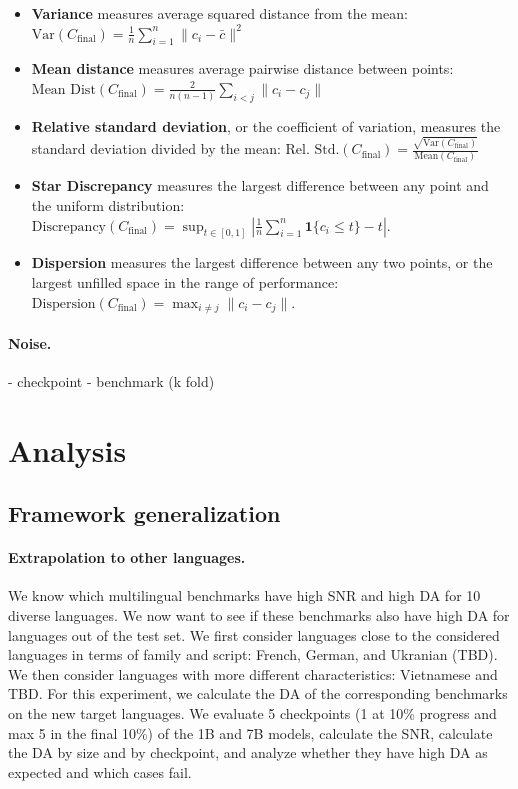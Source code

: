 \documentclass{article}
\begin{document}
\begin{itemize}
    \item \textbf{Variance} measures average squared distance from the mean: $\text{Var}(C_\text{final}) = \frac{1}{n} \sum_{i=1}^{n} \|c_i - \bar{c}\|^2$
    \item \textbf{Mean distance} measures average pairwise distance between points: $\text{Mean Dist}(C_\text{final}) = \frac{2}{n(n-1)} \sum_{i < j} \|c_i - c_j\|$
    \item \textbf{Relative standard deviation}, or the coefficient of variation, measures the standard deviation divided by the mean: $\text{Rel. Std.}(C_\text{final}) = \frac{\sqrt{\text{Var}(C_\text{final})}}{\text{Mean}(C_\text{final})}$
    \item \textbf{Star Discrepancy} measures the largest difference between any point and the uniform distribution: $\text{Discrepancy}(C_\text{final}) = \sup_{t \in [0,1]} \left| \frac{1}{n} \sum_{i=1}^n \mathbf{1}\{c_i \leq t\} - t \right|$. 
    \item \textbf{Dispersion} measures the largest difference between any two points, or the largest unfilled space in the range of performance: $\text{Dispersion}(C_\text{final}) = \max_{i \neq j} \|c_i - c_j\|$. 
\end{itemize}

\paragraph{Noise.} 

- checkpoint
- benchmark (k fold)

\section{Analysis}
\label{sec:analysis}


\subsection{Framework generalization}

\paragraph{Extrapolation to other languages.}
We know which multilingual benchmarks have high SNR and high DA for 10 diverse languages. We now want to see if these benchmarks also have high DA for languages out of the test set. We first consider languages close to the considered languages in terms of family and script: French, German, and Ukranian (TBD). We then consider languages with more different characteristics: Vietnamese and TBD.
For this experiment, we calculate the DA of the corresponding benchmarks on the new target languages.  We evaluate 5 checkpoints (1 at 10\% progress and max 5 in the final 10\%) of the 1B and 7B models, calculate the SNR, calculate the DA by size and by checkpoint, and analyze whether they have high DA as expected and which cases fail.
\end{document}
